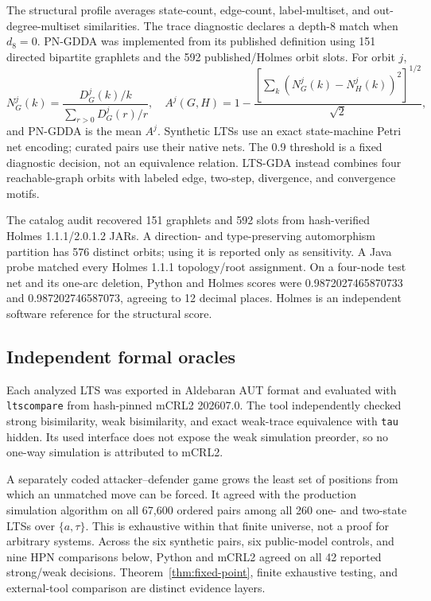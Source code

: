 \documentclass{ws-jbcb}
\numberwithin{equation}{section}
\newcommand{\TAU}{\tau}
\begin{document}
The structural profile averages state-count, edge-count, label-multiset, and
out-degree-multiset similarities. The trace diagnostic declares a depth-$8$
match when $d_8=0$. PN-GDDA was implemented from its published definition using
151 directed bipartite graphlets and the 592 published/Holmes orbit
slots.\cite{Szawulak2022} For orbit $j$,
\begin{equation}\label{eq:pn-gdda}
N_G^j(k)=\frac{D_G^j(k)/k}{\sum_{r>0}D_G^j(r)/r},\quad
A^j(G,H)=1-\frac{\left[\sum_k(N_G^j(k)-N_H^j(k))^2\right]^{1/2}}{\sqrt{2}},
\end{equation}
and PN-GDDA is the mean $A^j$. Synthetic LTSs use an exact state-machine Petri
net encoding; curated pairs use their native nets. The 0.9 threshold is a fixed
diagnostic decision, not an equivalence relation. LTS-GDA instead combines four
reachable-graph orbits with labeled edge, two-step, divergence, and convergence
motifs.

The catalog audit recovered 151 graphlets and 592 slots from hash-verified Holmes
1.1.1/2.0.1.2 JARs. A direction- and type-preserving automorphism partition has
576 distinct orbits; using it is reported only as sensitivity. A Java probe
matched every Holmes 1.1.1 topology/root assignment. On a four-node test net and
its one-arc deletion, Python and Holmes scores were 0.9872027465870733 and
0.987202746587073, agreeing to 12 decimal places. Holmes is an independent
software reference for the structural score.\cite{Radom2017}

\subsection{Independent formal oracles}\label{sec:mcrl2-method}

Each analyzed LTS was exported in Aldebaran AUT format and evaluated with
\texttt{ltscompare} from hash-pinned mCRL2 202607.0.\cite{Bunte2019} The tool
independently checked strong bisimilarity, weak bisimilarity, and exact weak-trace
equivalence with \texttt{tau} hidden. Its used interface does not expose the weak
simulation preorder, so no one-way simulation is attributed to mCRL2.

A separately coded attacker--defender game grows the least set of positions from
which an unmatched move can be forced. It agreed with the production simulation
algorithm on all 67,600 ordered pairs among all 260 one- and two-state LTSs over
$\{a,\TAU\}$. This is exhaustive within that finite universe, not a proof for
arbitrary systems. Across the six synthetic pairs, six public-model controls,
and nine HPN comparisons below, Python and mCRL2 agreed on all 42 reported
strong/weak decisions. Theorem~\ref{thm:fixed-point}, finite exhaustive testing,
and external-tool comparison are distinct evidence layers.
\end{document}
